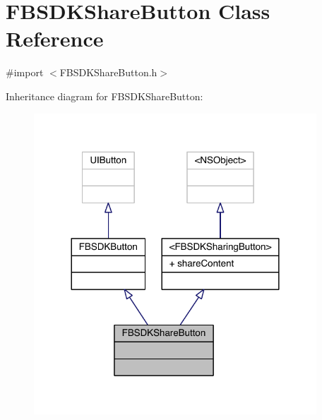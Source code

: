 \hypertarget{interface_f_b_s_d_k_share_button}{\section{F\-B\-S\-D\-K\-Share\-Button Class Reference}
\label{interface_f_b_s_d_k_share_button}
}


{\ttfamily \#import $<$F\-B\-S\-D\-K\-Share\-Button.\-h$>$}



Inheritance diagram for F\-B\-S\-D\-K\-Share\-Button\-:
\nopagebreak
\begin{figure}[H]
\begin{center}
\leavevmode
\includegraphics[width=300pt]{interface_f_b_s_d_k_share_button__inherit__graph}
\end{center}
\end{figure}


